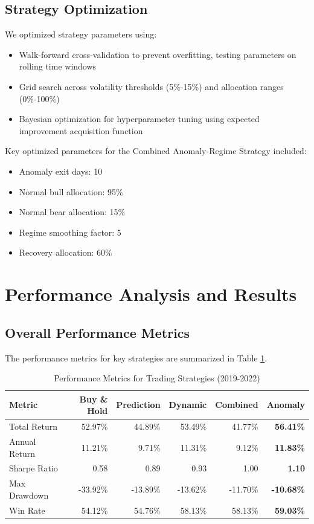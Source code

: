 \documentclass[13pt]{article}
\begin{document}
\subsection{Strategy Optimization}
We optimized strategy parameters using:
\begin{itemize}
	\item Walk-forward cross-validation to prevent overfitting, testing parameters on rolling time windows
	\item Grid search across volatility thresholds (5\%-15\%) and allocation ranges (0\%-100\%)
	\item Bayesian optimization for hyperparameter tuning using expected improvement acquisition function
\end{itemize}
\newpage
Key optimized parameters for the Combined Anomaly-Regime Strategy included:
\begin{itemize}
	\item Anomaly exit days: 10
	\item Normal bull allocation: 95\%
	\item Normal bear allocation: 15\%
	\item Regime smoothing factor: 5
	\item Recovery allocation: 60\%
\end{itemize}

\section{Performance Analysis and Results}

\subsection{Overall Performance Metrics}
The performance metrics for key strategies are summarized in Table \ref{performance}.

\begin{table}[htbp]
	\centering
	\begin{tabular}{l r r r r r}
		\toprule
		\textbf{Metric} & \textbf{Buy \& Hold} & \textbf{Prediction} & \textbf{Dynamic} & \textbf{Combined} & \textbf{Anomaly}  \\
		\midrule
		Total Return    & 52.97\%              & 44.89\%             & 53.49\%          & 41.77\%           & \textbf{56.41\%}  \\
		Annual Return   & 11.21\%              & 9.71\%              & 11.31\%          & 9.12\%            & \textbf{11.83\%}  \\
		Sharpe Ratio    & 0.58                 & 0.89                & 0.93             & 1.00              & \textbf{1.10}     \\
		Max Drawdown    & -33.92\%             & -13.89\%            & -13.62\%         & -11.70\%          & \textbf{-10.68\%} \\
		Win Rate        & 54.12\%              & 54.76\%             & 58.13\%          & 58.13\%           & \textbf{59.03\%}  \\
		\bottomrule
	\end{tabular}
	\caption{Performance Metrics for Trading Strategies (2019-2022)}
	\label{performance}
\end{table}
\end{document}
